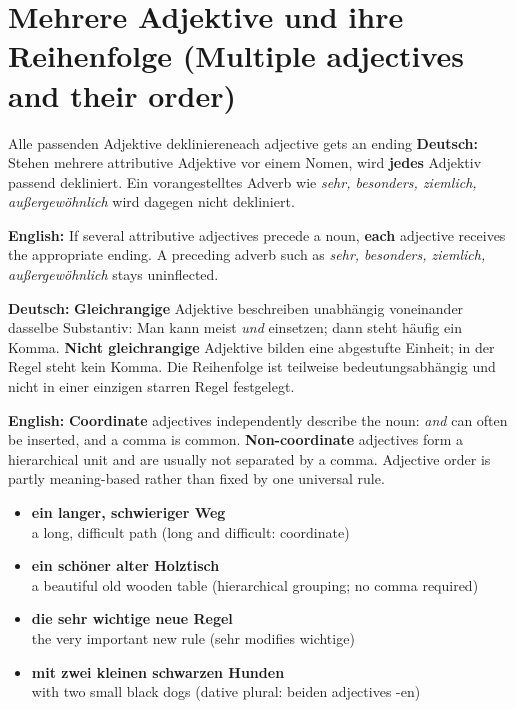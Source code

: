 \documentclass[a4paper,11pt]{article}
\newcommand{\GermanText}[1]{\textbf{Deutsch: }#1\par}
\newcommand{\EnglishText}[1]{{\small\color{SoftGray}\textbf{English: }#1\par}}
\newcommand{\ExampleItem}[2]{\item \textbf{#1}\\{\small\color{SoftGray}#2}}
\begin{document}
\section{Mehrere Adjektive und ihre Reihenfolge \textnormal{(Multiple adjectives and their order)}}
\begin{grammarentry}{Alle passenden Adjektive deklinieren}{each adjective gets an ending}
\GermanText{Stehen mehrere attributive Adjektive vor einem Nomen, wird \textbf{jedes} Adjektiv passend dekliniert. Ein vorangestelltes Adverb wie \emph{sehr, besonders, ziemlich, außergewöhnlich} wird dagegen nicht dekliniert.}
\EnglishText{If several attributive adjectives precede a noun, \textbf{each} adjective receives the appropriate ending. A preceding adverb such as \emph{sehr, besonders, ziemlich, außergewöhnlich} stays uninflected.}
\GermanText{\textbf{Gleichrangige} Adjektive beschreiben unabhängig voneinander dasselbe Substantiv: Man kann meist \emph{und} einsetzen; dann steht häufig ein Komma. \textbf{Nicht gleichrangige} Adjektive bilden eine abgestufte Einheit; in der Regel steht kein Komma. Die Reihenfolge ist teilweise bedeutungsabhängig und nicht in einer einzigen starren Regel festgelegt.}
\EnglishText{\textbf{Coordinate} adjectives independently describe the noun: \emph{and} can often be inserted, and a comma is common. \textbf{Non-coordinate} adjectives form a hierarchical unit and are usually not separated by a comma. Adjective order is partly meaning-based rather than fixed by one universal rule.}
\end{grammarentry}
\begin{exbox}\begin{itemize}
\ExampleItem{ein langer, schwieriger Weg}{a long, difficult path (long and difficult: coordinate)}
\ExampleItem{ein schöner alter Holztisch}{a beautiful old wooden table (hierarchical grouping; no comma required)}
\ExampleItem{die sehr wichtige neue Regel}{the very important new rule (sehr modifies wichtige)}
\ExampleItem{mit zwei kleinen schwarzen Hunden}{with two small black dogs (dative plural: beiden adjectives -en)}
\end{itemize}\end{exbox}
\end{document}
